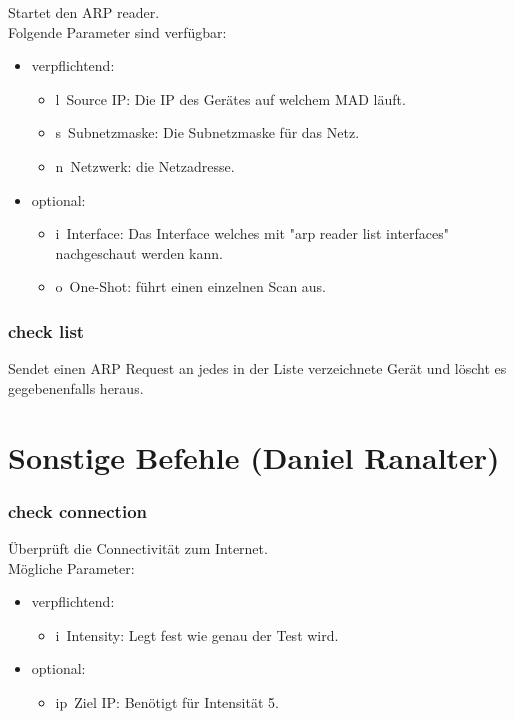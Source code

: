 \documentclass[12pt,a4paper]{report}
\begin{document}
\begin{onehalfspace}
Startet den ARP reader.\\
Folgende Parameter sind verfügbar:
\begin{itemize}
\item verpflichtend:
\begin{itemize}
\item \glqq l\grqq \ Source IP: Die IP des Gerätes auf welchem MAD läuft.
\item \glqq s\grqq \ Subnetzmaske: Die Subnetzmaske für das Netz.
\item \glqq n\grqq \ Netzwerk: die Netzadresse.
\end{itemize}
\item optional:
\begin{itemize}
\item \glqq i\grqq \ Interface: Das Interface welches mit "arp reader list interfaces" nachgeschaut werden kann.
\item \glqq o\grqq \ One-Shot: führt einen einzelnen Scan aus.
\end{itemize}
\end{itemize}

\subsubsection{check list}

Sendet einen ARP Request an jedes in der Liste verzeichnete Gerät und löscht es gegebenenfalls heraus.

\section{Sonstige Befehle (Daniel Ranalter)}\label{sec:commands}

\subsubsection{check connection}

Überprüft die Connectivität zum Internet.\\
Mögliche Parameter:
\begin{itemize}
\item verpflichtend:
\begin{itemize}
\item \glqq i\grqq \ Intensity: Legt fest wie genau der Test wird.
\end{itemize}
\item optional:
\begin{itemize}
\item \glqq ip\grqq \ Ziel IP: Benötigt für Intensität 5.
\end{itemize}
\end{itemize}


\end{onehalfspace}
\end{document}
